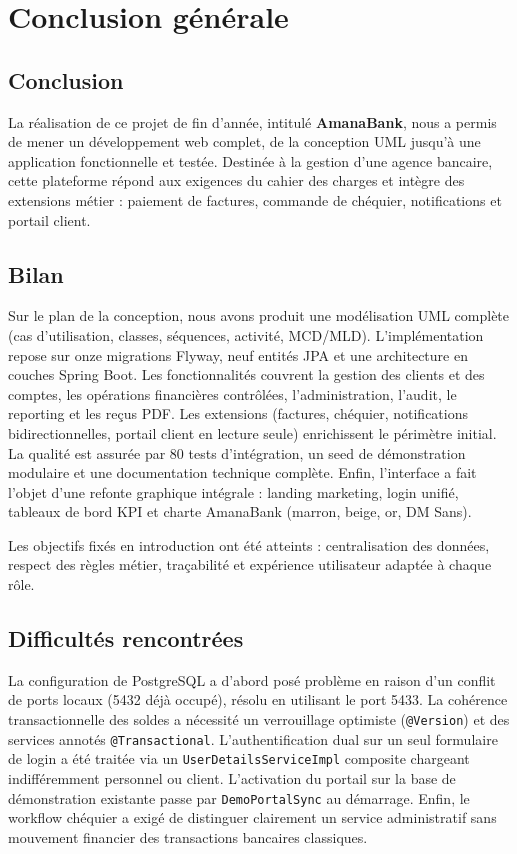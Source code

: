 \documentclass[11pt,a4paper,oneside]{report}
\newcommand{\nomapplication}{AmanaBank}
\begin{document}
\chapter*{Conclusion générale}

\section*{Conclusion}

La réalisation de ce projet de fin d'année, intitulé \textbf{\nomapplication}, nous a permis de mener un développement web complet, de la conception UML jusqu'à une application fonctionnelle et testée. Destinée à la gestion d'une agence bancaire, cette plateforme répond aux exigences du cahier des charges et intègre des extensions métier : paiement de factures, commande de chéquier, notifications et portail client.

\section*{Bilan}

Sur le plan de la conception, nous avons produit une modélisation UML complète (cas d'utilisation, classes, séquences, activité, MCD/MLD). L'implémentation repose sur onze migrations Flyway, neuf entités JPA et une architecture en couches Spring Boot. Les fonctionnalités couvrent la gestion des clients et des comptes, les opérations financières contrôlées, l'administration, l'audit, le reporting et les reçus PDF. Les extensions (factures, chéquier, notifications bidirectionnelles, portail client en lecture seule) enrichissent le périmètre initial. La qualité est assurée par 80 tests d'intégration, un seed de démonstration modulaire et une documentation technique complète. Enfin, l'interface a fait l'objet d'une refonte graphique intégrale : landing marketing, login unifié, tableaux de bord KPI et charte AmanaBank (marron, beige, or, DM Sans).

Les objectifs fixés en introduction ont été atteints : centralisation des données, respect des règles métier, traçabilité et expérience utilisateur adaptée à chaque rôle.

\section*{Difficultés rencontrées}

La configuration de PostgreSQL a d'abord posé problème en raison d'un conflit de ports locaux (5432 déjà occupé), résolu en utilisant le port 5433. La cohérence transactionnelle des soldes a nécessité un verrouillage optimiste (\texttt{@Version}) et des services annotés \texttt{@Transactional}. L'authentification dual sur un seul formulaire de login a été traitée via un \texttt{UserDetailsServiceImpl} composite chargeant indifféremment personnel ou client. L'activation du portail sur la base de démonstration existante passe par \texttt{DemoPortalSync} au démarrage. Enfin, le workflow chéquier a exigé de distinguer clairement un service administratif sans mouvement financier des transactions bancaires classiques.
\end{document}
